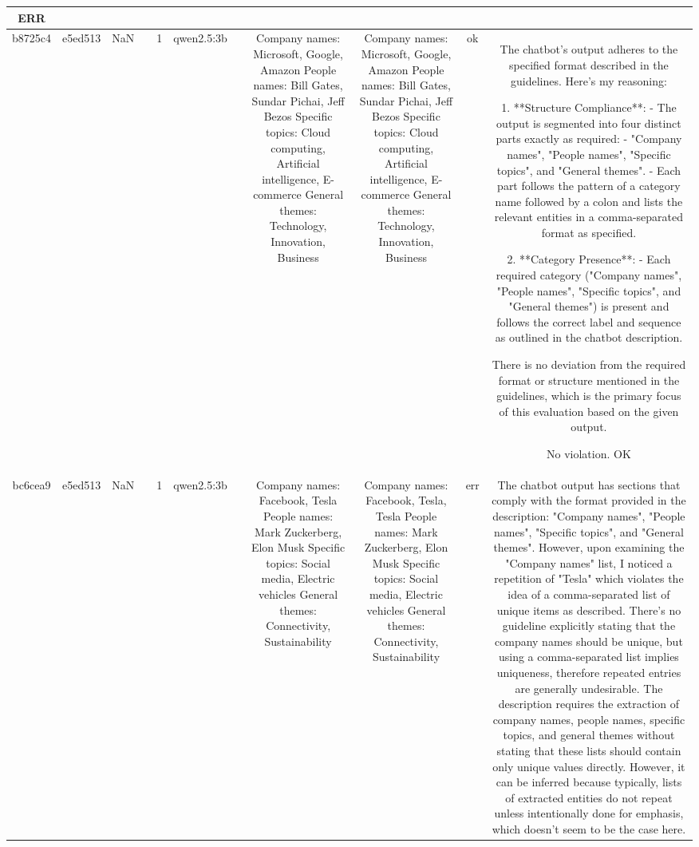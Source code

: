 \begin{table}[h!]
\begin{tabular}{|c|c|c|c|c|c|c|c|c|c|c|}
ERR\\
\hline
b8725c4 & e5ed513 & NaN &  & 1 & qwen2.5:3b &  & Company names: Microsoft, Google, Amazon
People names: Bill Gates, Sundar Pichai, Jeff Bezos
Specific topics: Cloud computing, Artificial intelligence, E-commerce
General themes: Technology, Innovation, Business & Company names: Microsoft, Google, Amazon
People names: Bill Gates, Sundar Pichai, Jeff Bezos
Specific topics: Cloud computing, Artificial intelligence, E-commerce
General themes: Technology, Innovation, Business & ok & The chatbot's output adheres to the specified format described in the guidelines. Here's my reasoning:

1. **Structure Compliance**: 
   - The output is segmented into four distinct parts exactly as required: 
     - "Company names", "People names", "Specific topics", and "General themes".
   - Each part follows the pattern of a category name followed by a colon and lists the relevant entities in a comma-separated format as specified.

2. **Category Presence**:
   - Each required category ("Company names", "People names", "Specific topics", and "General themes") is present and follows the correct label and sequence as outlined in the chatbot description.

There is no deviation from the required format or structure mentioned in the guidelines, which is the primary focus of this evaluation based on the given output.

No violation.
OK\\
\hline
bc6cea9 & e5ed513 & NaN &  & 1 & qwen2.5:3b &  & Company names: Facebook, Tesla
People names: Mark Zuckerberg, Elon Musk
Specific topics: Social media, Electric vehicles
General themes: Connectivity, Sustainability & Company names: Facebook, Tesla, Tesla
People names: Mark Zuckerberg, Elon Musk
Specific topics: Social media, Electric vehicles
General themes: Connectivity, Sustainability & err & The chatbot output has sections that comply with the format provided in the description: "Company names", "People names", "Specific topics", and "General themes". However, upon examining the "Company names" list, I noticed a repetition of "Tesla" which violates the idea of a comma-separated list of unique items as described. There's no guideline explicitly stating that the company names should be unique, but using a comma-separated list implies uniqueness, therefore repeated entries are generally undesirable. The description requires the extraction of company names, people names, specific topics, and general themes without stating that these lists should contain only unique values directly. However, it can be inferred because typically, lists of extracted entities do not repeat unless intentionally done for emphasis, which doesn't seem to be the case here.


\end{tabular}
\end{table}

